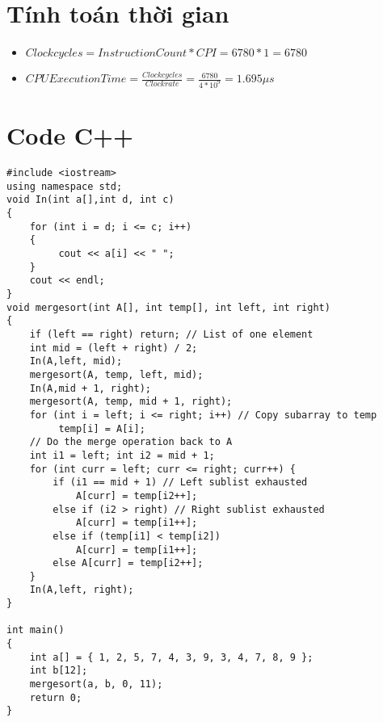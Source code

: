\documentclass[a4paper]{article}
\begin{document}
\section{Tính toán thời gian}
\begin{itemize}
	\item $ Clock cycles = Instruction Count * CPI = 6780 * 1 = 6780 $
	\item $ CPU Execution Time =\frac{Clock cycles}{Clock rate} = \frac{6780}{4 * 10^9}  = 1.695  \mu s $
\end{itemize}

\section{Code C++}
\begin{verbatim}
#include <iostream>
using namespace std;
void In(int a[],int d, int c)
{
    for (int i = d; i <= c; i++)
    {
         cout << a[i] << " ";
    }
    cout << endl; 
}
void mergesort(int A[], int temp[], int left, int right) 
{
    if (left == right) return; // List of one element
    int mid = (left + right) / 2;
    In(A,left, mid);
    mergesort(A, temp, left, mid);
    In(A,mid + 1, right);
    mergesort(A, temp, mid + 1, right);
    for (int i = left; i <= right; i++) // Copy subarray to temp
         temp[i] = A[i]; 
    // Do the merge operation back to A
    int i1 = left; int i2 = mid + 1;
    for (int curr = left; curr <= right; curr++) {
        if (i1 == mid + 1) // Left sublist exhausted
            A[curr] = temp[i2++];
        else if (i2 > right) // Right sublist exhausted
            A[curr] = temp[i1++];
        else if (temp[i1] < temp[i2])
            A[curr] = temp[i1++];
        else A[curr] = temp[i2++];
    }
    In(A,left, right);
}

int main() 
{
    int a[] = { 1, 2, 5, 7, 4, 3, 9, 3, 4, 7, 8, 9 };
    int b[12];
    mergesort(a, b, 0, 11);
    return 0;
}
\end{verbatim}
\end{document}
